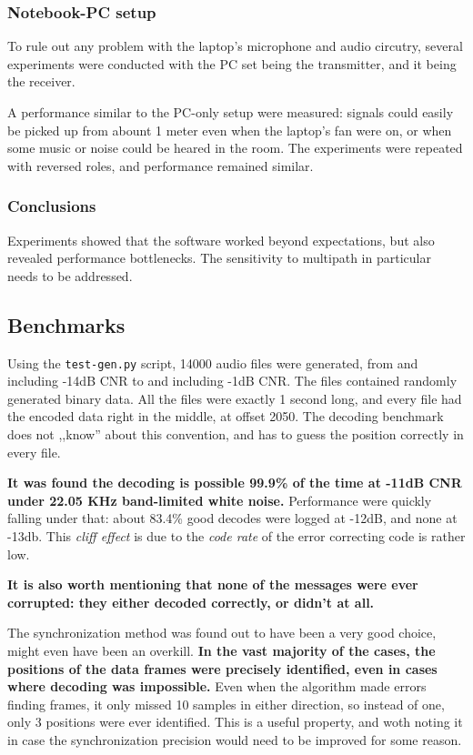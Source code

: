 \documentclass[a4paper]{article}
\begin{document}
\subsubsection{Notebook-PC setup}

To rule out any problem with the laptop's microphone and audio 
circutry, several experiments were conducted with the PC set being the 
transmitter, and it being the receiver.

A performance similar to the PC-only setup were measured: signals could 
easily be picked up from abount 1 meter even when the laptop's fan were 
on, or when some music or noise could be heared in the room. The
experiments were repeated with reversed roles, and performance remained
similar.

\subsubsection{Conclusions}

Experiments showed that the software worked beyond expectations, but also
revealed performance bottlenecks. The sensitivity to multipath in
particular needs to be addressed.

\subsection{Benchmarks}

Using the \texttt{test-gen.py} script, 14000 audio files were 
generated, from and including -14dB CNR to and including -1dB CNR. The 
files contained randomly generated binary data. All the files were 
exactly 1 second long, and every file had the encoded data right in the 
middle, at offset 2050. The decoding benchmark does not ,,know'' about 
this convention, and has to guess the position correctly in every file.

\textbf{It was found the decoding is possible 99.9\% of the time at 
-11dB CNR under 22.05 KHz band-limited white noise.} Performance were 
quickly falling under that: about 83.4\% good decodes were logged at 
-12dB, and none at -13db. This \emph{cliff effect} is due to the 
\emph{code rate} of the error correcting code is rather low.

\textbf{It is also worth mentioning that none of the messages were ever 
corrupted: they either decoded correctly, or didn't at all.}

The synchronization method was found out to have been a very good 
choice, might even have been an overkill. \textbf{In the vast majority 
of the cases, the positions of the data frames were precisely 
identified, even in cases where decoding was impossible.} Even when the 
algorithm made errors finding frames, it only missed 10 samples in 
either direction, so instead of one, only 3 positions were ever 
identified. This is a useful property, and woth noting it in case the
synchronization precision would need to be improved for some reason.
\end{document}

